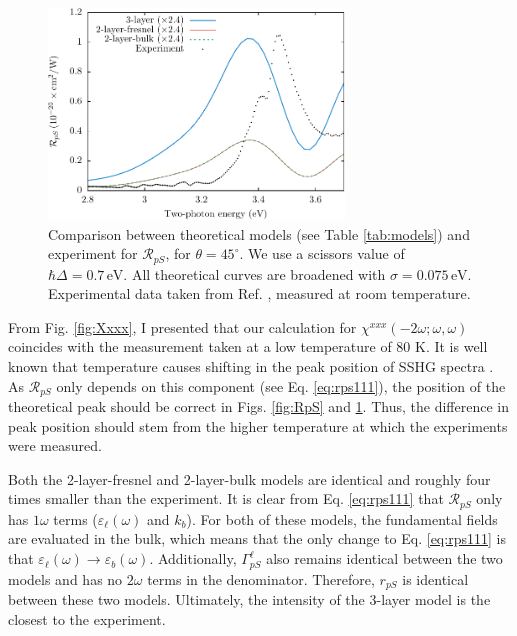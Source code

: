 \begin{figure}
\centering
\includegraphics[width=0.7\textwidth]{content/figures/fig-4_4_02}
\caption{Comparison between theoretical models (see Table
\ref{tab:models}) and experiment for $\mathcal{R}_{pS}$, for $\theta=45^\circ$.
We use a scissors value of $\hbar\Delta = 0.7\,\text{eV}$. All theoretical
curves are broadened with $\sigma=0.075\,\text{eV}$. Experimental data taken
from Ref. \cite{mitchellSS01}, measured at room temperature.}
\label{fig:mitchellRpS}
\end{figure}

From Fig. \ref{fig:Xxxx}, I presented that our calculation for
$\chi^{xxx}(-2\omega;\omega,\omega)$ coincides with the measurement taken at a
low temperature of 80 K. It is well known that temperature causes shifting in
the peak position of SSHG spectra \cite{dadapPRB97}. As $\mathcal{R}_{pS}$ only
depends on this component (see Eq. \eqref{eq:rps111}), the position of the
theoretical peak should be correct in Figs. \ref{fig:RpS} and
\ref{fig:mitchellRpS}. Thus, the difference in peak position should stem from
the higher temperature at which the experiments were measured.

Both the 2-layer-fresnel and 2-layer-bulk models are identical and roughly four
times smaller than the experiment. It is clear from Eq. \eqref{eq:rps111} that
$\mathcal{R}_{pS}$ only has $1\omega$ terms ($\varepsilon_{\ell}(\omega)$ and
$k_{b}$). For both of these models, the fundamental fields are evaluated in the
bulk, which means that the only change to Eq. \eqref{eq:rps111} is that
$\varepsilon_{\ell}(\omega) \rightarrow \varepsilon_{b}(\omega)$. Additionally,
$\Gamma^{\ell}_{pS}$ also remains identical between the two models and has no
$2\omega$ terms in the denominator. Therefore, $r_{pS}$ is identical between
these two models. Ultimately, the intensity of the 3-layer model is the closest
to the experiment.

